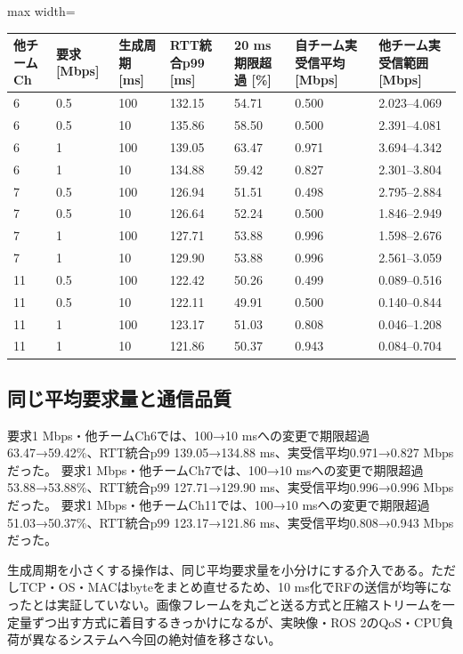 \documentclass[a4paper,10pt]{ltjsarticle}
\begin{document}
\begin{center}\small\begin{adjustbox}{max width=\linewidth}
\begin{tabular}{lllllll}\toprule
他チームCh & 要求 [Mbps] & 生成周期 [ms] & RTT統合p99 [ms] & 20 ms期限超過 [\%] & 自チーム実受信平均 [Mbps] & 他チーム実受信範囲 [Mbps]\\
\midrule
6 & 0.5 & 100 & 132.15 & 54.71 & 0.500 & 2.023–4.069\\
6 & 0.5 & 10 & 135.86 & 58.50 & 0.500 & 2.391–4.081\\
6 & 1 & 100 & 139.05 & 63.47 & 0.971 & 3.694–4.342\\
6 & 1 & 10 & 134.88 & 59.42 & 0.827 & 2.301–3.804\\
7 & 0.5 & 100 & 126.94 & 51.51 & 0.498 & 2.795–2.884\\
7 & 0.5 & 10 & 126.64 & 52.24 & 0.500 & 1.846–2.949\\
7 & 1 & 100 & 127.71 & 53.88 & 0.996 & 1.598–2.676\\
7 & 1 & 10 & 129.90 & 53.88 & 0.996 & 2.561–3.059\\
11 & 0.5 & 100 & 122.42 & 50.26 & 0.499 & 0.089–0.516\\
11 & 0.5 & 10 & 122.11 & 49.91 & 0.500 & 0.140–0.844\\
11 & 1 & 100 & 123.17 & 51.03 & 0.808 & 0.046–1.208\\
11 & 1 & 10 & 121.86 & 50.37 & 0.943 & 0.084–0.704\\
\bottomrule\end{tabular}\end{adjustbox}\end{center}

\subsection{同じ平均要求量と通信品質}

要求1 Mbps・他チームCh6では、100→10 msへの変更で期限超過63.47→59.42\%、RTT統合p99 139.05→134.88 ms、実受信平均0.971→0.827 Mbpsだった。
要求1 Mbps・他チームCh7では、100→10 msへの変更で期限超過53.88→53.88\%、RTT統合p99 127.71→129.90 ms、実受信平均0.996→0.996 Mbpsだった。
要求1 Mbps・他チームCh11では、100→10 msへの変更で期限超過51.03→50.37\%、RTT統合p99 123.17→121.86 ms、実受信平均0.808→0.943 Mbpsだった。

生成周期を小さくする操作は、同じ平均要求量を小分けにする介入である。ただしTCP・OS・MACはbyteをまとめ直せるため、10 ms化でRFの送信が均等になったとは実証していない。画像フレームを丸ごと送る方式と圧縮ストリームを一定量ずつ出す方式に着目するきっかけになるが、実映像・ROS 2のQoS・CPU負荷が異なるシステムへ今回の絶対値を移さない。
\end{document}
